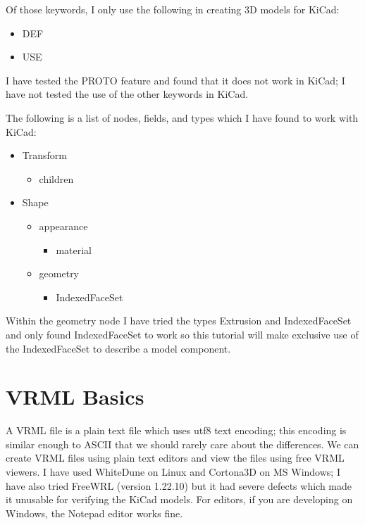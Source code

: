 \documentclass[a4paper]{article}
\begin{document}
Of those keywords, I only use the following in creating 3D models for KiCad:
\begin{itemize}
\item {DEF}
\item {USE}
\end{itemize}

I have tested the PROTO feature and found that it does not work in KiCad; I have not tested the use of the other keywords in KiCad.

The following is a list of nodes, fields, and types which I have found to work with KiCad:

\begin{itemize}
\item Transform
  \begin{itemize}
    \item children
  \end{itemize}
\item Shape
  \begin{itemize}
    \item appearance
      \begin{itemize}
        \item material
      \end{itemize}
    \item geometry
      \begin{itemize}
        \item IndexedFaceSet
      \end{itemize}
  \end{itemize}
\end{itemize}

Within the geometry node I have tried the types Extrusion and IndexedFaceSet and only found IndexedFaceSet to work so this tutorial will
make exclusive use of the IndexedFaceSet to describe a model component.

\section{VRML Basics}
 A VRML file is a plain text file which uses utf8 text encoding; this encoding is similar enough to ASCII that we should rarely care about the differences.
We can create VRML files using plain text editors and view the files using free VRML viewers. I have used WhiteDune on Linux and Cortona3D on
MS Windows; I have also tried FreeWRL (version 1.22.10) but it had severe defects which made it unusable for verifying the KiCad models.
For editors, if you are developing on Windows, the Notepad editor works fine.
\end{document}
